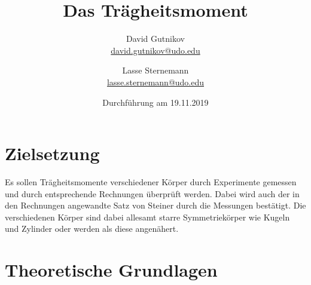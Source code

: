 \documentclass[titlepage = firstcover]{scrartcl}
\title{Das Trägheitsmoment}
\author{
  David Gutnikov\\
  \href{mailto:david.gutnikov@udo.edu}{david.gutnikov@udo.edu}
 \and 
  Lasse Sternemann\\
  \href{mailto:lasse.sternemann@udo.edu}{lasse.sternemann@udo.edu}
}
\date{Durchführung am 19.11.2019}
\begin{document}
    \maketitle
    \tableofcontents
    \newpage

    \section{Zielsetzung}
    Es sollen Trägheitsmomente verschiedener Körper durch Experimente gemessen und durch entsprechende Rechnungen überprüft werden. 
    Dabei wird auch der in den Rechnungen angewandte Satz von Steiner durch die Messungen bestätigt. Die verschiedenen Körper sind dabei 
    allesamt starre Symmetriekörper wie Kugeln und Zylinder oder werden als diese angenähert.

    \section{Theoretische Grundlagen}
\end{document}
